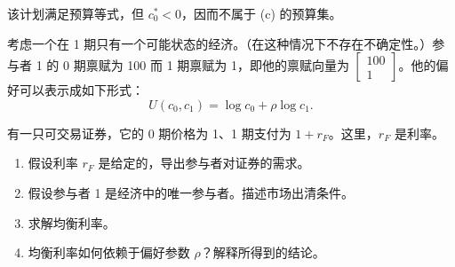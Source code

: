 \begin{solution}[blank-type=manual,blank-vsep=9\baselineskip]
\begin{enumerate}[label=(\alph*)]
    该计划满足预算等式，但 $c_{0}^{*}<0$，因而不属于 (c) 的预算集。
\end{enumerate}
\end{solution}

\par\noindent
\begin{minipage}{\linewidth}
\begin{problem}
 考虑一个在 1 期只有一个可能状态的经济。（在这种情况下不存在不确定性。）参与者 1 的 0 期禀赋为 100 而 1 期禀赋为 1，即他的禀赋向量为 $\begin{bmatrix}100 \\ 1\end{bmatrix}$。他的偏好可以表示成如下形式：
\[
    U(c_{0},c_{1})=\log c_{0}+\rho\log c_{1}.
\]

有一只可交易证券，它的 0 期价格为 1、1 期支付为 $1+r_{F}$。这里，$r_{F}$ 是利率。
\begin{enumerate}[label=(\alph*)]
    \item 假设利率 $r_{F}$ 是给定的，导出参与者对证券的需求。
    \item 假设参与者 1 是经济中的唯一参与者。描述市场出清条件。
    \item 求解均衡利率。
    \item 均衡利率如何依赖于偏好参数 $\rho$？解释所得到的结论。
\end{enumerate}
\end{problem}
\end{minipage}\par
